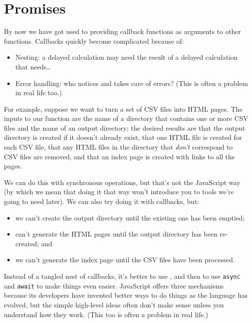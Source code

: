 \chapter{Promises}\label{s:promises}

By now we have got used to providing callback functions as arguments to other
functions.
Callbacks quickly become complicated because of:

\begin{itemize}
\item
  Nesting: a delayed calculation may need the result of a delayed calculation that needs{\ldots}
\item
  Error handling: who notices and takes care of errors?
  (This is often a problem in real life too.)
\end{itemize}

For example,
suppose we want to turn a set of CSV files into HTML pages.
The inputs to our function are the name of a directory that contains one or more CSV files
and the name of an output directory;
the desired results are
that the output directory is created if it doesn't already exist,
that one HTML file is created for each CSV file,
that any HTML files in the directory that \emph{don't} correspond to CSV files are removed,
and that an index page is created with links to all the pages.

We can do this with synchronous operations,
but that's not the JavaScript way
(by which we mean that doing it that way won't introduce you to tools we're going to need later).
We can also try doing it with callbacks, but:

\begin{itemize}
\item
  we can't create the output directory until the existing one has been emptied;
\item
  can't generate the HTML pages until the output directory has been re-created; and
\item
  we can't generate the index page until the CSV files have been processed.
\end{itemize}

Instead of a tangled nest of callbacks,
it's better to use ,
and then to use \texttt{async} and \texttt{await} to make things even easier.
JavaScript offers three mechanisms because
its developers have invented better ways to do things as the language has evolved,
but the simple high-level ideas often don't make sense unless you understand how they work.
(This too is often a problem in real life.)

